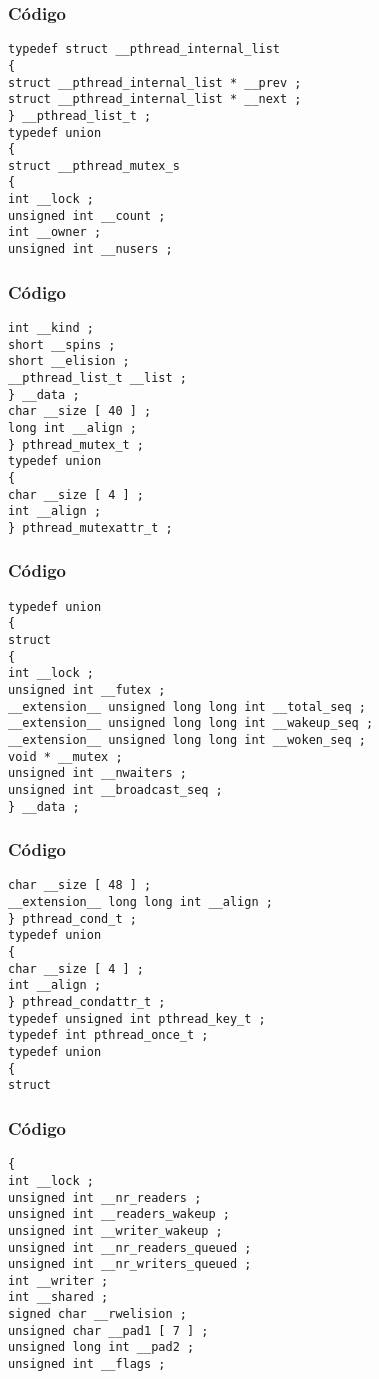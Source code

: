 \documentclass{beamer}
\begin{document}
\begin{frame}[fragile]
\frametitle{C\'odigo}
\begin{verbatim}
typedef struct __pthread_internal_list 
{ 
struct __pthread_internal_list * __prev ; 
struct __pthread_internal_list * __next ; 
} __pthread_list_t ; 
typedef union 
{ 
struct __pthread_mutex_s 
{ 
int __lock ; 
unsigned int __count ; 
int __owner ; 
unsigned int __nusers ; 
\end{verbatim}
\end{frame}
\begin{frame}[fragile]
\frametitle{C\'odigo}
\begin{verbatim}
int __kind ; 
short __spins ; 
short __elision ; 
__pthread_list_t __list ; 
} __data ; 
char __size [ 40 ] ; 
long int __align ; 
} pthread_mutex_t ; 
typedef union 
{ 
char __size [ 4 ] ; 
int __align ; 
} pthread_mutexattr_t ; 
\end{verbatim}
\end{frame}
\begin{frame}[fragile]
\frametitle{C\'odigo}
\begin{verbatim}
typedef union 
{ 
struct 
{ 
int __lock ; 
unsigned int __futex ; 
__extension__ unsigned long long int __total_seq ; 
__extension__ unsigned long long int __wakeup_seq ; 
__extension__ unsigned long long int __woken_seq ; 
void * __mutex ; 
unsigned int __nwaiters ; 
unsigned int __broadcast_seq ; 
} __data ; 
\end{verbatim}
\end{frame}
\begin{frame}[fragile]
\frametitle{C\'odigo}
\begin{verbatim}
char __size [ 48 ] ; 
__extension__ long long int __align ; 
} pthread_cond_t ; 
typedef union 
{ 
char __size [ 4 ] ; 
int __align ; 
} pthread_condattr_t ; 
typedef unsigned int pthread_key_t ; 
typedef int pthread_once_t ; 
typedef union 
{ 
struct 
\end{verbatim}
\end{frame}
\begin{frame}[fragile]
\frametitle{C\'odigo}
\begin{verbatim}
{ 
int __lock ; 
unsigned int __nr_readers ; 
unsigned int __readers_wakeup ; 
unsigned int __writer_wakeup ; 
unsigned int __nr_readers_queued ; 
unsigned int __nr_writers_queued ; 
int __writer ; 
int __shared ; 
signed char __rwelision ; 
unsigned char __pad1 [ 7 ] ; 
unsigned long int __pad2 ; 
unsigned int __flags ; 
\end{verbatim}
\end{frame}
\end{document}
